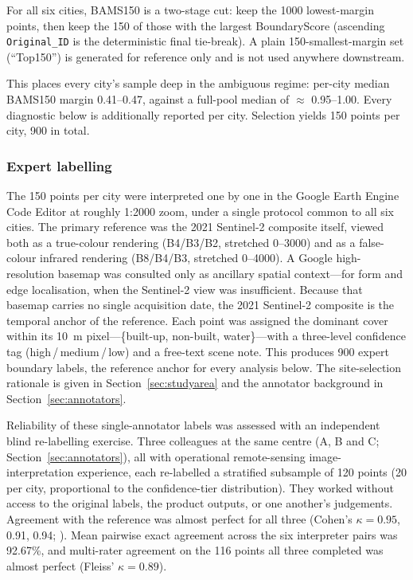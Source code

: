 \documentclass[remotesensing,article,submit,moreauthors]{Definitions/mdpi}
\begin{document}
For all six cities, BAMS150 is a two-stage cut: keep the 1000 lowest-margin
points, then keep the 150 of those with the largest BoundaryScore (ascending
\texttt{Original\_ID} is the deterministic final tie-break). A plain
150-smallest-margin set (``Top150'') is generated for reference only and is not
used anywhere downstream.

This places every city's sample deep in the ambiguous regime: per-city median
BAMS150 margin 0.41--0.47, against a full-pool median of $\approx$ 0.95--1.00.
Every diagnostic below is additionally reported per city. Selection yields 150
points per city, 900 in total.

\subsubsection*{Expert labelling}

The 150 points per city were interpreted one by one in the Google Earth Engine
Code Editor at roughly 1:2000 zoom, under a single protocol common to all six
cities. The primary reference was the 2021 Sentinel-2 composite itself, viewed
both as a true-colour rendering (B4/B3/B2, stretched 0--3000) and as a
false-colour infrared rendering (B8/B4/B3, stretched 0--4000). A Google
high-resolution basemap was consulted only as ancillary spatial context---for
form and edge localisation, when the Sentinel-2 view was insufficient. Because
that basemap carries no single acquisition date, the 2021 Sentinel-2 composite
is the temporal anchor of the reference. Each point was assigned the dominant
cover within its 10~m pixel---\{built-up, non-built, water\}---with a
three-level confidence tag (high\,/\,medium\,/\,low) and a free-text scene
note. This produces 900 expert boundary labels, the reference anchor for every
analysis below. The site-selection rationale is given in
Section~\ref{sec:studyarea} and the annotator background in
Section~\ref{sec:annotators}.

Reliability of these single-annotator labels was assessed with an independent
blind re-labelling exercise. Three colleagues at the same centre (A, B and C;
Section~\ref{sec:annotators}), all with operational remote-sensing
image-interpretation experience, each re-labelled a stratified subsample of 120
points (20 per city, proportional to the confidence-tier distribution). They
worked without access to the original labels, the product outputs, or one
another's judgements. Agreement with the reference was almost perfect for all
three (Cohen's $\kappa = 0.95$, 0.91, 0.94; \cite{landis1977}). Mean
pairwise exact agreement across the six interpreter pairs was 92.67\%, and
multi-rater agreement on the 116 points all three completed was almost perfect
(Fleiss' $\kappa = 0.89$).
\end{document}
